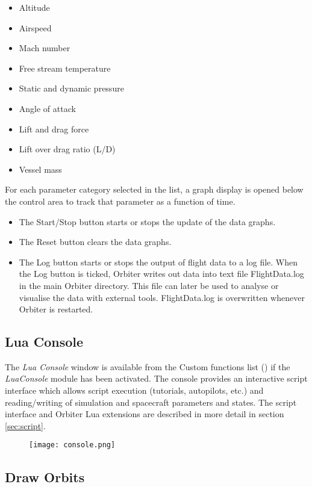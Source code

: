 \documentclass[Orbiter User Manual.tex]{subfiles}
\begin{document}
\begin{itemize}
\item Altitude
\item Airspeed
\item Mach number
\item Free stream temperature
\item Static and dynamic pressure
\item Angle of attack
\item Lift and drag force
\item Lift over drag ratio (L/D)
\item Vessel mass
\end{itemize}

\noindent
For each parameter category selected in the list, a graph display is opened below the control area to track that parameter as a function of time.

\begin{itemize}
\item The Start/Stop button starts or stops the update of the data graphs.
\item The Reset button clears the data graphs.
\item The Log button starts or stops the output of flight data to a log file. When the Log button is ticked, Orbiter writes out data into text file FlightData.log in the main Orbiter directory. This file can later be used to analyse or visualise the data with external tools. FlightData.log is overwritten whenever Orbiter is restarted.
\end{itemize}


\subsection{Lua Console}
\label{ssec:lua_console}
The \textit{Lua Console} window is available from the Custom functions list (\Ctrl{}) if the \textit{LuaConsole} module has been activated. The console provides an interactive script interface which allows script execution (tutorials, autopilots, etc.) and reading/writing of simulation and spacecraft parameters and states. The script interface and Orbiter Lua extensions are described in more detail in section \ref{sec:script}.

\begin{figure}[H]
	\centering
	\texttt{[image: console.png]}
\end{figure}


\subsection{Draw Orbits}
\end{document}

